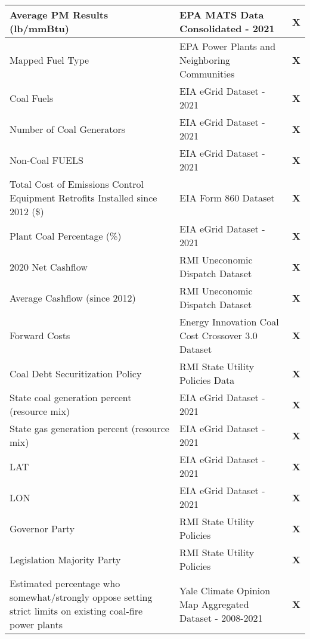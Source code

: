 \begin{table}[H]
\begin{adjustbox}{width=\textwidth}
\begin{tabular}{|l | l | l |}
        \midrule
        Average PM Results (lb/mmBtu) & EPA MATS Data Consolidated - 2021 & \textbf{X} \\
        \midrule
        Mapped Fuel Type & EPA Power Plants and Neighboring Communities & \textbf{X} \\
        \midrule
        Coal Fuels & EIA eGrid Dataset - 2021 & \textbf{X} \\
        \midrule
        Number of Coal Generators & EIA eGrid Dataset - 2021 & \textbf{X} \\
        \midrule
        Non-Coal FUELS & EIA eGrid Dataset - 2021 & \textbf{X} \\
        \midrule
        Total Cost of Emissions Control Equipment Retrofits Installed since 2012 (\$) & EIA Form 860 Dataset & \textbf{X} \\
        \midrule
        Plant Coal Percentage (\%) & EIA eGrid Dataset - 2021 & \textbf{X} \\
        \midrule
        2020 Net Cashflow & RMI Uneconomic Dispatch Dataset & \textbf{X} \\
        \midrule
        Average Cashflow (since 2012) & RMI Uneconomic Dispatch Dataset & \textbf{X} \\
        \midrule
        Forward Costs & Energy Innovation Coal Cost Crossover 3.0 Dataset & \textbf{X} \\
        \midrule
        Coal Debt Securitization Policy & RMI State Utility Policies Data & \textbf{X} \\
        \midrule
        State coal generation percent (resource mix) & EIA eGrid Dataset - 2021 & \textbf{X} \\
        \midrule
        State gas generation percent (resource mix) & EIA eGrid Dataset - 2021 & \textbf{X} \\
        \midrule
        LAT & EIA eGrid Dataset - 2021 & \textbf{X} \\
        \midrule
        LON & EIA eGrid Dataset - 2021 & \textbf{X} \\
        \midrule
        Governor Party & RMI State Utility Policies & \textbf{X} \\
        \midrule
        Legislation Majority Party & RMI State Utility Policies & \textbf{X} \\
        \midrule
        Estimated percentage who somewhat/strongly oppose setting strict limits on existing coal-fire power plants & Yale Climate Opinion Map Aggregated Dataset - 2008-2021 & \textbf{X} \\
        \midrule

\end{tabular}
\end{adjustbox}
\end{table}
